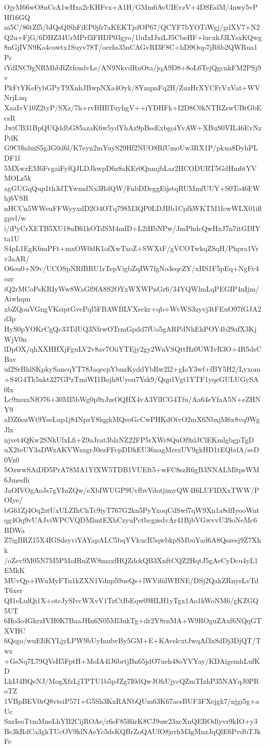 OjyM66wO8uCsA1wHxa2cKHFvx+A1H/GMm6AvUIEvzV+4DSEslM/4nwy5vPHf16GQ
ni5C/86tZf5/bIQsQlShFiEP0jfr7aKEKTjsfOP67/QCYF7bYOTiWgj/gdXV7+N2
Q2u+FjG/6DHZ34UrMPrf3FHDP03gyo/1luIxIJxiLJ5CbeHF+lucxkJ3LYsxKQwg
8nGjIVN9Ko4cowtx1Suyv78T/oerks35nCAGvRI3F8C+hD9Oop7jR6b2QWRua1Pc
iYdINC9gNRMhbRZtfendvLe/AN9NkvdRuOta/jqA9D8+8oL6TejQgcnkFM2PSj9v
PkFtYKeFybGPyT9XnhJBwpNXa4Oyk/8YmpnFq2H/ZuzHrXYCFrVxVat+WVNrjLuq
XaaIvV10Z2tyP/SXz/7h+rvBHIlTuyhgV++iYDHFk+I2D8C0kNTRZswUBtGbEcsR
JwiCB31BpQUQddbG85azaK6w5ydYhAz9pBssExbgoiYvAW+XBuS0VIL46EvNzPdK
G9C0hdmS5g3G0d6l/K7eyn2mYuyS29Hf2NUO8RlUmoUw3RX1P/pkua8DyhPLDF1f
5MXwzEM6FvgaiFyfQJLDJkwpD6z8aKEr0QnmjbLar2HCODURT5GdHm6tYVMOLz5k
agGUGqQup1th3dTYwmdNx3RdQW/FnbDDeggEijstqRUMmfUUY+S0To46FWhj6VSR
nHCCn5WWeuFFWyyxdD2O4OTq798M3QP0LDJBb1CpfkWKTM1fcwWLX01iflgpvl/w
i/iPyCrXETB5XU18uB61kOTdSM4mfD+L2iHbNPw/JmPhdcQwHxJ7n7itGDIYta1U
S4pL1EgK6mPFt+mxOW0dK1ofXwTxoZ+SWXtF/gVCOTwkqZSqH/Phpra1Vrv3aAR/
O6ou0+N9v/UCOSpNRfBRU1rTepVigbZqIW7fgNo3eqeZY/xHS1F5pEq+NgFv4ozr
iQ2rMCoPsKRIyWw8WaGf9fA8S2OYxWXWPnGr6/34YQWlmLqPEGIP4nIjm/Aiwhqm
xbZQouVGngVKsiptGvePql5FBAWBLVXeckr+qb+WvWS3zyvj3tFEuO97fGJA2d3p
HyS0pYOKrCgQc33TdUQ3NfrwOTrmGpdd7fUo5gARPdNhEhPOY4b29afX3KjWjV0n
lDpOX/qhXXHHXjFguLV2v8av7OiiYTEjy2gy2WuVSQttHz0UWIvR3O+4R5dsCBav
uf2SrBhlSKpkySancqYT78JaqecpYbuzKyddYbRw2l2+gIoY3wf+fBY5H2/Lyxom
+S4G4Tk5nkt327GPzTmiWI1Bojh8Uyou7Ysk9/Qqp1Vgt1YTF1yqeGULUGySA0lx
Lc9xsuxNfO76+30MI5bWg0p9xJzsOQHX4vA3YlICG4Tfu/Aa64eYfaA5N+eZHNY9
aDZ6ozWt9YseLup1j84NpzY8lqgkMQeoGcCwPHKdOivO2mX6NbxjM6x8vq9WgJlx
njvet4QKw2SNkUfxLfi+Z9aJrat3blzNZ22FP5rXWr8QuOl9zlJClEKmlgbgpTgD
uX2teUY3aDWzAKVWzagrJ0ezFFcpDDkEU36nagMrsxUV9gkHD1tEQbdA/seD0Vz0
5OzwwSAiDD5PrA78MA1YfXW5TDB1VUEft5+wFC8szR6gB3NNALMltpsWM6Jmesfh
JaOIVOgAoJs7gVIuZQw/eXbIWUGP9UvfbvVdotjimyQW4I6LUFIDXxTWW/POIye/
bG61Zj4Oq2ztUxULZIhChTc9iyT767G2kn5PyYxoqCdSwf7qW9Xn1a8dfIyooWnt
qg4Oq9vUAJviWPCVQDMlmtEXhCzyuPctbcgzsdvAr41BjbVGwvvU3SoNeMc6BDWa
Z7igBRZ15X4IGSdsyviYAYapALC5bqYVkucR5qwbkpSMbuYad6A8Qszeej9Z7Xhk
/oZev9M05N7M5PMoIRuZW8maxfHQZdckQB3XnftCQZ2HqtJ5gAeCyDcu4yL1EMkK
MUvQp+IWuMyFTu1kZXN1Vdnp59ueQs+lWVi6ilWBNE/DSj2QakZRnysLvTdT6xer
QI1eLulQi1X+otcJySIvcWXvV1TzCtIbEqw09HLH1yTgx1Ao1kWoNM6/gKZGQ5UT
6Ho3o4GkrzIVH0K7BaaJHn6N05Ml3ukTg+dr2Y8rnMA+W9ROguZAxf6NQqGTXVHC
6Qsgo/wuEIiKYLjyLPW9bUyInubvBy5GM+E+KAvslcxtJwqAf3x8dDj3DjQT/Twz
+GsNq7L79QVsH5FptH+MoIA4lJ6brtjBn65jdO7ueh48oYVYay/KDAigemhLufKD
LkIJ4BQeNJ/MogXfzLjTPTU1b5pJZg7I0dQwJOhUjycQZmTIzhP35NAYqJ0PRoTZ
1VBpBEV0rQ8vteiP571+G5Sh3KxRANbQUm63K67acsBUF3FXejgk7/njgi5g+aUc
SnrIeoTtmMneLhYB2CijROAe/r6sF85l6irK8CJ9uw23xcXnQEBOdlyvr9kIO+y3
Bc3kRdCa3gkTUcOV9klNAeYc5dsKQBrZoQAUfO8jrrhM3gMnzJqQlE6PvdbTJkFe
